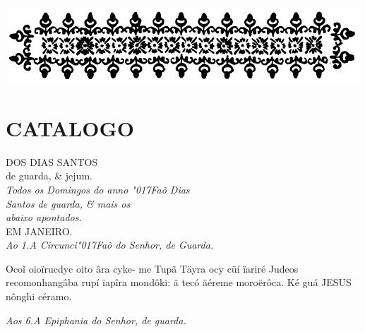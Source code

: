 \documentclass[openany,titlepage,12pt]{book}
\renewcommand{\chaptermark}[1]{\markboth{#1}{}}
\renewcommand{\sectionmark}[1]{\gdef\rightmark{#1}}
\newcommand{\lgS}{\char"017F}
\begin{document}
\begin{center}
    \vspace*{20pt}
    \includegraphics[scale=0.40]{12.livro3.png}
\end{center}
\unskip
\vspace{-30pt}
{\let\clearpage\relax \chapter{\Huge CATALOGO}}
\unskip
\vspace{-2pt}
\begin{center}
    {\large DOS DIAS SANTOS\\de guarda, \& jejum.\\}
    \vspace{4pt}
    \textit{Todos os Domingos do anno \lgS aõ Dias\\
    Santos de guarda, \& mais os\\
    abaixo apontados.\\}
    \vspace{4pt}
    {EM JANEIRO.\\}
    \vspace{4pt}
    \textit{Ao 1.A Circunci\lgS aõ do Senhor, de Guarda.}
\end{center}
\chaptermark{Dialogo I.}
\sectionmark{Honrarás hum \lgS ó Deos.
}
\hspace*{0ex}\begin{minipage}[t]{1.08\linewidth}
    \lettrine
    [findent =-2pt, nindent=0pt, loversize=-0.2, lraise=0.05, lines=5]
    {}{O}co\~i oioïrucdyc oito âra cyke-
    me Tupã Täyra ocy cüí ïariré
    Judeos recomonhangâba rupí
    ïapîra mondôki: ã tecó äéreme
    moroërôca. Ké guá  JESUS    
    nônghi céramo.
\end{minipage}

\begin{center}
    \textit{Aos 6.A Epiphania do Senhor, de guarda.}
\end{center}
\end{document}
